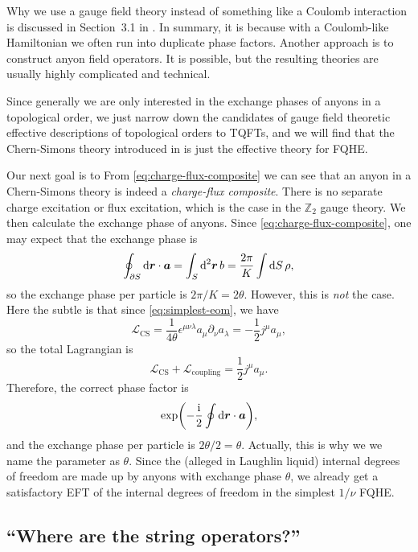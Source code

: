 \documentclass[hyperref, a4paper]{article}
\newcommand*{\ii}{\mathrm{i}}
\begin{document}
Why we use a gauge field theory instead of something like a Coulomb interaction is discussed in Section~3.1
in \cite{viefers_anyons}. In summary, it is because with a Coulomb-like Hamiltonian we often run into 
duplicate phase factors. Another approach is to construct anyon field operators. It is possible, but 
the resulting theories are usually highly complicated and technical.  

Since generally we are only interested in the exchange phases of anyons in a topological order, we just 
narrow down the candidates of gauge field theoretic effective descriptions of topological orders to TQFTs, 
and we will find that the Chern-Simons theory introduced in  is just the effective 
theory for FQHE. 

Our next goal is to 
From \eqref{eq:charge-flux-composite} we can see that an anyon in a Chern-Simons theory is indeed a
\emph{charge-flux composite}. There is no separate charge excitation or flux excitation, 
which is the case in the $\mathbb{Z}_2$ gauge theory. We then calculate the exchange phase of anyons.
Since \eqref{eq:charge-flux-composite}, one may expect that the exchange phase is 
\[
    \oint_{\partial S} \dd{\vb*{r}} \cdot \vb*{a} = \int_S \dd[2]{\vb*{r}} b = \frac{2\pi}{K} \int \dd{S} \rho,
\] 
so the exchange phase per particle is $2\pi / K = 2 \theta$. However, this is \emph{not} the case.
Here the subtle is that since \eqref{eq:simplest-eom}, we have 
\[
    \mathcal{L}_\text{CS} = \frac{1}{4 \theta} \epsilon^{\mu \nu \lambda} a_\mu \partial_\nu a_\lambda = - \frac{1}{2} j^\mu a_\mu,
\]
so the total Lagrangian is 
\[
    \mathcal{L}_\text{CS} + \mathcal{L}_\text{coupling} = \frac{1}{2} j^\mu a_\mu.
\]
Therefore, the correct phase factor is 
\[
    \exp(- \frac{\ii}{2} \oint \dd{\vb*{r}} \cdot \vb*{a}),
\]
and the exchange phase per particle is $2 \theta / 2 = \theta$. Actually, this is why we we name the parameter as $\theta$. 
Since the (alleged in Laughlin liquid) internal degrees of freedom are made up by anyons with exchange phase $\theta$,
we already get a satisfactory EFT of the internal degrees of freedom in the simplest $1/ \nu$ FQHE.

\subsection{``Where are the string operators?''}
\end{document}
